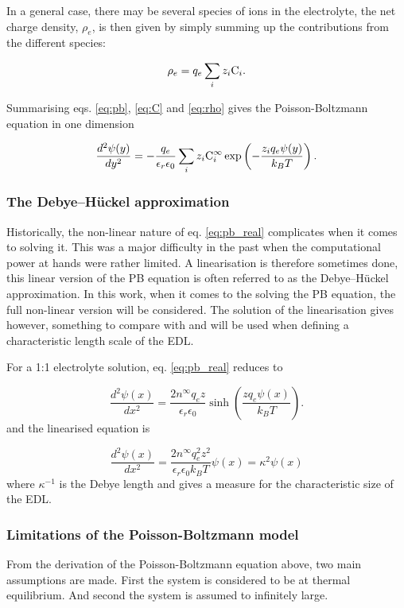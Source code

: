 In a general case, there may be several species of ions in the
electrolyte, the net charge density, $\rho_e$, is then given by simply
summing up the contributions from the different species:

\begin{equation}\label{eq:rho}
\rho_e = q_e\sum_i z_i \mathrm{C}_i.
\end{equation}

Summarising eqs. \eqref{eq:pb}, \eqref{eq:C} and \eqref{eq:rho} gives
the Poisson-Boltzmann equation in one dimension

\begin{equation}\label{eq:pb_real}
\dfrac{d^2\mathrm{\psi}(y)}{dy^2} = -\frac{q_e}{\epsilon_r \epsilon_0}\sum_i z_i
\mathrm{C}_i^{\infty} \exp\left(-\frac{z_i q_e \mathrm{\psi}(y)}{k_BT}\right).
\end{equation}

\subsubsection{The Debye–Hückel approximation}
Historically, the non-linear nature of eq. \eqref{eq:pb_real}
complicates when it comes to solving it. This was a major difficulty
in the past when the computational power at hands were rather
limited. A linearisation is therefore sometimes done, this linear
version of the PB equation is often referred to as the Debye–Hückel
approximation. In this work, when it comes to the solving the PB
equation, the full non-linear version will be considered. The solution
of the linearisation gives however, something to compare with and will
be used when defining a characteristic length scale of the EDL.

For a 1:1 electrolyte solution, eq. \eqref{eq:pb_real} reduces to

\begin{equation}
\frac{d^2\psi(x)}{dx^2} = \frac{2n^{\infty}q_ez}{\epsilon_r
  \epsilon_0}
\sinh\left(\frac{z q_e \psi(x)}{k_BT}\right).
\end{equation}
and the linearised equation is

\begin{equation}
\frac{d^2\psi(x)}{dx^2} = \frac{2n^{\infty}q_e^2z^2}{\epsilon_r
  \epsilon_0 k_B T} \psi(x) = \kappa^2 \psi(x)
\end{equation}
where $\kappa^{-1}$ is the Debye length and gives a measure for the
characteristic size of the EDL.

\subsubsection{Limitations of the Poisson-Boltzmann model}
From the derivation of the Poisson-Boltzmann equation above, two main
assumptions are made. First the system is considered to be at thermal
equilibrium. And second the system is assumed to infinitely large. 

